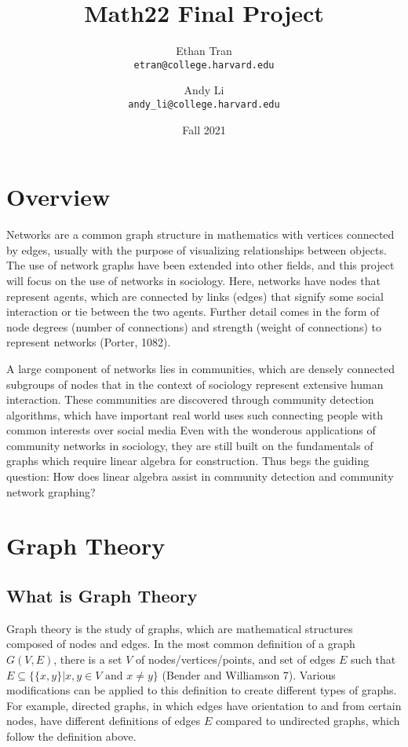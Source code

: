 \documentclass{article}
\title{Math22 Final Project}
\date{Fall 2021}
\author{Ethan Tran\\ \texttt{etran@college.harvard.edu} \and Andy Li\\ \texttt{andy\_li@college.harvard.edu}}
\begin{document}
\maketitle

\pagebreak

\tableofcontents

\section{Overview}
Networks are a common graph structure in mathematics with vertices connected by edges, usually with the purpose of visualizing relationships between objects.
The use of network graphs have been extended into other fields, and this project will focus on the use of networks in sociology.
Here, networks have nodes that represent agents, which are connected by links (edges) that signify some social interaction or tie between the two agents.
Further detail comes in the form of node degrees (number of connections) and strength (weight of connections) to represent networks (Porter, 1082). 
 
A large component of networks lies in communities, which are densely connected subgroups of nodes that in the context of sociology represent extensive human interaction.
These communities are discovered through community detection algorithms, which have important real world uses such connecting people with common interests over social media
Even with the wonderous applications of community networks in sociology, they are still built on the fundamentals of graphs which require linear algebra for construction. 
Thus begs the guiding question:
How does linear algebra assist in community detection and community network graphing?

\section{Graph Theory}

\subsection{What is Graph Theory}
Graph theory is the study of graphs, which are mathematical structures composed of nodes and edges. In the most common definition of a graph $G(V, E)$, there is a set $V$ of nodes/vertices/points, and set of edges $E$ such that \\$E \subseteq \{\{x, y\} | x, y \in V \text{ and } x \neq y\}$ (Bender and Williamson 7). Various modifications can be applied to this definition to create different types of graphs. For example, directed graphs, in which edges have orientation to and from certain nodes, have different definitions of edges $E$ compared to undirected graphs, which follow the definition above.   
\end{document}
